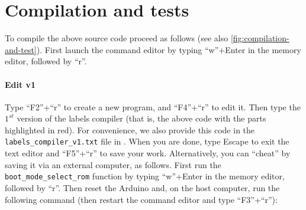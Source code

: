 

\section{Compilation and tests}\label{section:toyc1-compilation}


To compile the above source code proceed as follows (see also
\cref{fig:compilation-and-test}). First launch the command editor by typing
``w''+Enter in the memory editor,
followed by ``r''.

\medskip \paragraph*{Edit v1} Type ``F2''+``r'' to create a new program, and
``F4''+``r'' to edit it. Then type the $1^{st}$ version of the labels compiler
(that is, the above code with the parts highlighted in red). For convenience,
we also provide this code in the {\tt labels\_compiler\_v1.txt} file in
. When you are done, type Escape to exit the text editor
and ``F5''+``r'' to save your work. Alternatively, you can ``cheat'' by saving
it via an external computer, as follows. First run the
\verb!boot_mode_select_rom! function by typing
``w''+Enter in the memory editor, followed
by ``r''. Then reset the Arduino and, on the host computer, run the following
command (then restart the command editor and type ``F3''+``r''):


